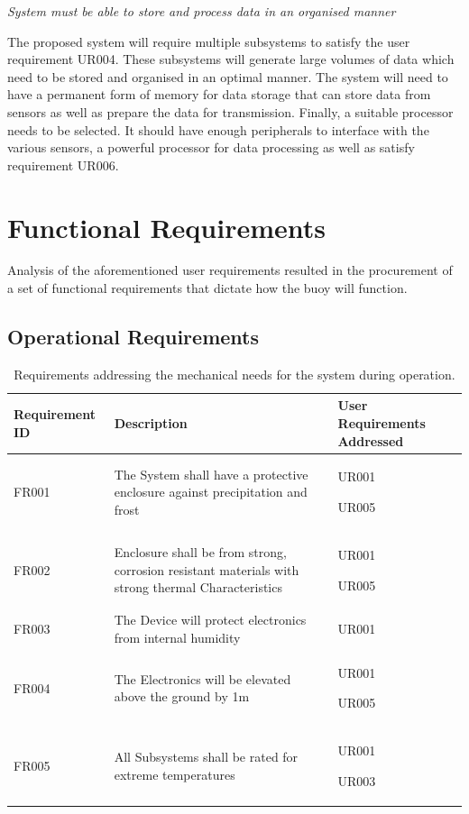 \textit{System must be able to store and process data in an organised manner}

The proposed system will require multiple subsystems to satisfy the user requirement UR004. These subsystems will generate large volumes of data which need to be stored and organised in an optimal manner. The system will need to have a permanent form of memory for data storage that can store data from sensors as well as prepare the data for transmission. Finally, a suitable processor needs to be selected. It should have enough peripherals to interface with the various sensors, a powerful processor for data processing as well as satisfy requirement UR006.

\section{Functional Requirements}
\label{sec:ch3_FR}
Analysis of the aforementioned user requirements resulted in the procurement of a set of functional requirements that dictate how the buoy will function.

\subsection{Operational Requirements }

\begin{table}[H]
    \centering
    \caption{Requirements addressing the mechanical needs for the system during operation.}
    \begin{tabular}{|>{\centering}m{}|>{\RaggedRight}m{}| >{\RaggedRight}m{} |}
    \hline
         Requirement ID & Description & User Requirements Addressed\\
         \hline
         FR001 & The System shall have a protective enclosure against precipitation and frost & UR001 \par UR005 \\
         \hline
         FR002 & Enclosure shall be from strong, corrosion resistant materials with strong thermal Characteristics &  UR001\par UR005 \\
         \hline
         FR003 & The Device will protect electronics from internal humidity & UR001\\
         \hline 
         FR004 & The Electronics will be elevated above the ground by 1m & UR001\par UR005 \\
         \hline
        FR005 & All Subsystems shall be rated for extreme temperatures & UR001\par UR003\\
         \hline
    \end{tabular}

    \label{tab:hard_funcreqsl}
\end{table}

